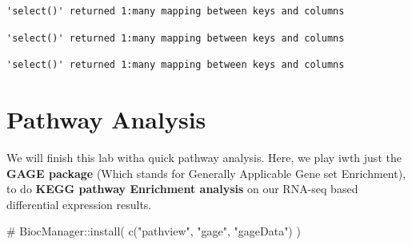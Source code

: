 \documentclass[
  letterpaper,
  DIV=11,
  numbers=noendperiod]{scrartcl}
\newenvironment{Shaded}{\begin{snugshade}}{\end{snugshade}}
\newcommand{\AttributeTok}[1]{\textcolor[rgb]{0.40,0.45,0.13}{#1}}
\newcommand{\CommentTok}[1]{\textcolor[rgb]{0.37,0.37,0.37}{#1}}
\newcommand{\FunctionTok}[1]{\textcolor[rgb]{0.28,0.35,0.67}{#1}}
\newcommand{\NormalTok}[1]{\textcolor[rgb]{0.00,0.23,0.31}{#1}}
\newcommand{\OtherTok}[1]{\textcolor[rgb]{0.00,0.23,0.31}{#1}}
\newcommand{\SpecialCharTok}[1]{\textcolor[rgb]{0.37,0.37,0.37}{#1}}
\newcommand{\StringTok}[1]{\textcolor[rgb]{0.13,0.47,0.30}{#1}}
\begin{document}
\begin{verbatim}
'select()' returned 1:many mapping between keys and columns
\end{verbatim}

\begin{Shaded}
\end{Shaded}

\begin{verbatim}
'select()' returned 1:many mapping between keys and columns
\end{verbatim}

\begin{Shaded}
\end{Shaded}

\begin{verbatim}
'select()' returned 1:many mapping between keys and columns
\end{verbatim}

\hypertarget{pathway-analysis}{%
\section{Pathway Analysis}\label{pathway-analysis}}

We will finish this lab witha quick pathway analysis. Here, we play iwth
just the \textbf{GAGE package} (Which stands for Generally Applicable
Gene set Enrichment), to do \textbf{KEGG pathway Enrichment analysis} on
our RNA-seq based differential expression results.

\begin{Shaded}
\begin{Highlighting}[]
\CommentTok{\# BiocManager::install( c("pathview", "gage", "gageData") )}
\end{Highlighting}
\end{Shaded}
\end{document}
